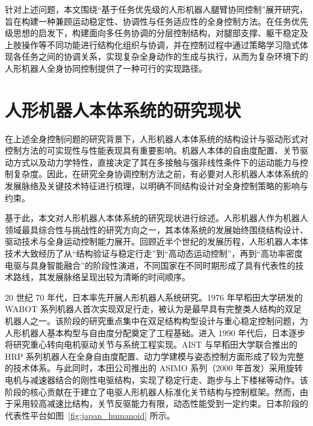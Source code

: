 针对上述问题，本文围绕“基于任务优先级的人形机器人腿臂协同控制”展开研究，旨在构建一种兼顾运动稳定性、协调性与任务适应性的全身控制方法。在任务优先级思想的启发下，构建面向多任务协调的分层控制结构，对腿部支撑、躯干稳定及上肢操作等不同功能进行结构化组织与协调，并在控制过程中通过策略学习隐式体现各任务之间的协调关系，实现复杂全身动作的生成与执行，从而为复杂环境下的人形机器人全身协同控制提供了一种可行的实现路径。


\section{人形机器人本体系统的研究现状}

在上述全身控制问题的研究背景下，人形机器人本体系统的结构设计与驱动形式对控制方法的可实现性与性能表现具有重要影响。机器人本体的自由度配置、关节驱动方式以及动力学特性，直接决定了其在多接触与强非线性条件下的运动能力与控制复杂度。因此，在研究全身协调控制方法之前，有必要对人形机器人本体系统的发展脉络及关键技术特征进行梳理，以明确不同结构设计对全身控制策略的影响与约束。

基于此，本文对人形机器人本体系统的研究现状进行综述。人形机器人作为机器人领域最具综合性与挑战性的研究方向之一，其本体系统的发展始终围绕结构设计、驱动技术与全身运动控制能力展开。回顾近半个世纪的发展历程，人形机器人本体技术大致经历了从“结构验证与稳定行走”到“高动态运动控制”，再到“高功率密度电驱与具身智能融合”的阶段性演进，不同国家在不同时期形成了具有代表性的技术路线，其发展脉络呈现出较为清晰的时间顺序。

20 世纪 70 年代，日本率先开展人形机器人系统研究。1976 年早稻田大学研发的 WABOT 系列机器人首次实现双足行走，被认为是最早具有完整类人结构的双足机器人之一\cite{Kato1976WABOT}。该阶段的研究重点集中在双足结构构型设计与重心稳定控制问题，为人形机器人基本构型与自由度分配奠定了工程基础。进入 1990 年代后，日本逐步将研究重心转向电机驱动关节与系统工程实现。AIST 与早稻田大学联合推出的 HRP 系列机器人在全身自由度配置、动力学建模与姿态控制方面形成了较为完整的技术体系\cite{Kaneko2004HRP2}。与此同时，本田公司推出的 ASIMO 系列（2000 年首发）采用旋转电机与减速器结合的刚性电驱结构，实现了稳定行走、跑步与上下楼梯等动作\cite{Sakagami2002ASIMO}。该阶段的核心贡献在于建立了电驱人形机器人标准化关节结构与控制框架。然而，由于采用较高减速比结构，关节反驱能力有限，动态性能受到一定约束。日本阶段的代表性平台如图~\ref{fig:japan_humanoid} 所示。



